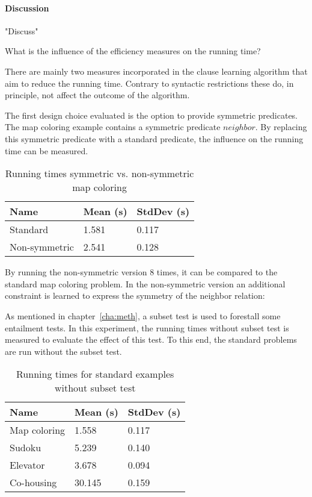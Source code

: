 \paragraph{Discussion}
"Discuss"

\begin{question}
	What is the influence of the efficiency measures on the running time?
\end{question}

There are mainly two measures incorporated in the clause learning algorithm that aim to reduce the running time.
Contrary to syntactic restrictions these do, in principle, not affect the outcome of the algorithm.

\begin{experiment}
	The first design choice evaluated is the option to provide symmetric predicates.
	The map coloring example contains a symmetric predicate $\mathit{neighbor}$.
	By replacing this symmetric predicate with a standard predicate, the influence on the running time can be measured.

	\begin{table}[!htp]
		\begin{tabularx}{\textwidth}{XXX}
			\textbf{Name}	& \textbf{Mean (s)}	& \textbf{StdDev (s)} \\
			\toprule
			Standard & 1.581 & 0.117 \\
			Non-symmetric & 2.541 & 0.128 \\
		\end{tabularx}
		\label{tbl:exp_speed_symm}
		\caption{Running times symmetric vs. non-symmetric map coloring}
	\end{table}

	By running the non-symmetric version $8$ times, it can be compared to the standard map coloring problem.
	In the non-symmetric version an additional constraint is learned to express the symmetry of the neighbor relation: 
\end{experiment}

\begin{experiment}
	As mentioned in chapter~\ref{cha:meth}, a subset test is used to forestall some entailment tests.
	In this experiment, the running times without subset test is measured to evaluate the effect of this test.
	To this end, the standard problems are run without the subset test.

	\begin{table}[!htp]
		\begin{tabularx}{\textwidth}{XXX}
			\textbf{Name}	& \textbf{Mean (s)}	& \textbf{StdDev (s)} \\
			\toprule
			Map coloring 	& 1.558				& 0.117 \\
			Sudoku 			& 5.239				& 0.140 \\
			Elevator 		& 3.678 			& 0.094 \\
			Co-housing 		& 30.145			& 0.159
		\end{tabularx}
		\label{tbl:exp_speed_standard}
		\caption{Running times for standard examples without subset test}
	\end{table}
\end{experiment}

